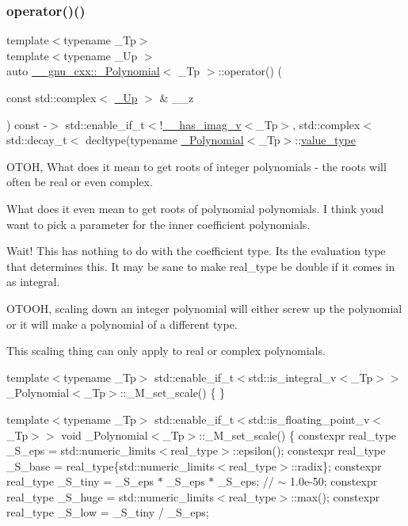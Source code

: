 \subsubsection{\texorpdfstring{operator()()}{operator()()}\hspace{0.1cm}{\footnotesize\ttfamily [1/4]}}
{\footnotesize\ttfamily template$<$typename \+\_\+\+Tp$>$ \\
template$<$typename \+\_\+\+Up $>$ \\
auto \hyperlink{class____gnu__cxx_1_1__Polynomial}{\+\_\+\+\_\+gnu\+\_\+cxx\+::\+\_\+\+Polynomial}$<$ \+\_\+\+Tp $>$\+::operator() (\begin{DoxyParamCaption}\item[{const std\+::complex$<$ \hyperlink{class____gnu__cxx_1_1__Polynomial_a242114d4b86648a5dff67a8221f80d40}{\+\_\+\+Up} $>$ \&}]{\+\_\+\+\_\+z }\end{DoxyParamCaption}) const -\/$>$ std\+::enable\+\_\+if\+\_\+t$<$!\hyperlink{namespace____gnu__cxx_afa2404a914b06f950f3a46e75aca51a9}{\+\_\+\+\_\+has\+\_\+imag\+\_\+v}$<$\+\_\+\+Tp$>$,
			  std\+::complex$<$std\+::decay\+\_\+t$<$
		decltype(typename \hyperlink{class____gnu__cxx_1_1__Polynomial}{\+\_\+\+Polynomial}$<$\+\_\+\+Tp$>$\+::\hyperlink{class____gnu__cxx_1_1__Polynomial_a725563351f50e76084a7a016c06f8a53}{value\+\_\+type}}

O\+T\+OH, What does it mean to get roots of integer polynomials -\/ the roots will often be real or even complex.

What does it even mean to get roots of polynomial polynomials. I think you\textquotesingle{}d want to pick a parameter for the inner coefficient polynomials.

Wait! This has nothing to do with the coefficient type. It\textquotesingle{}s the evaluation type that determines this. It may be sane to make real\+\_\+type be double if it comes in as integral.

O\+T\+O\+OH, scaling down an integer polynomial will either screw up the polynomial or it will make a polynomial of a different type.

This scaling thing can only apply to real or complex polynomials.

template$<$typename \+\_\+\+Tp$>$ std\+::enable\+\_\+if\+\_\+t$<$std\+::is\+\_\+integral\+\_\+v$<$\+\_\+\+Tp$>$$>$ \+\_\+\+Polynomial$<$\+\_\+\+Tp$>$\+::\+\_\+\+M\+\_\+set\+\_\+scale() \{ \}

template$<$typename \+\_\+\+Tp$>$ std\+::enable\+\_\+if\+\_\+t$<$std\+::is\+\_\+floating\+\_\+point\+\_\+v$<$\+\_\+\+Tp$>$$>$ void \+\_\+\+Polynomial$<$\+\_\+\+Tp$>$\+::\+\_\+\+M\+\_\+set\+\_\+scale() \{ constexpr real\+\_\+type \+\_\+\+S\+\_\+eps = std\+::numeric\+\_\+limits$<$real\+\_\+type$>$\+::epsilon(); constexpr real\+\_\+type \+\_\+\+S\+\_\+base = real\+\_\+type\{std\+::numeric\+\_\+limits$<$real\+\_\+type$>$\+::radix\}; constexpr real\+\_\+type \+\_\+\+S\+\_\+tiny = \+\_\+\+S\+\_\+eps $\ast$ \+\_\+\+S\+\_\+eps $\ast$ \+\_\+\+S\+\_\+eps; // $\sim$ 1.\+0e-\/50; constexpr real\+\_\+type \+\_\+\+S\+\_\+huge = std\+::numeric\+\_\+limits$<$real\+\_\+type$>$\+::max(); constexpr real\+\_\+type \+\_\+\+S\+\_\+low = \+\_\+\+S\+\_\+tiny / \+\_\+\+S\+\_\+eps;


